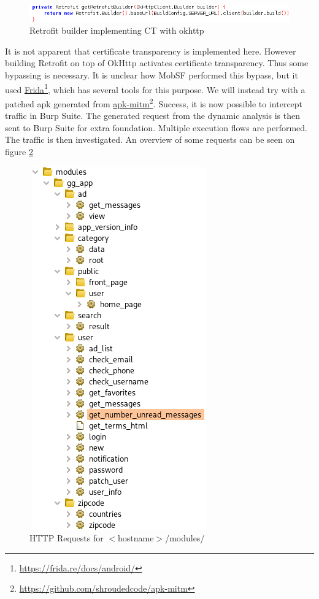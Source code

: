 \begin{figure}[htbp]
    \centering
    \includegraphics[width=1\columnwidth]{../static-analysis/pictures/retrofit-okkhtp-builder.png}
    \caption{Retrofit builder implementing CT with okhttp}
    \label{fig:retrofit-ct}
\end{figure}

It is not apparent that certificate transparency is implemented here. However building Retrofit on top of OkHttp activates certificate transparency\cite{android-certificate-transparency}. Thus some bypassing is necessary. It is unclear how MobSF performed this bypass, but it used \href{https://frida.re/docs/android/}{Frida}\footnote{\href{https://frida.re/docs/android/}{https://frida.re/docs/android/}}, which has several tools for this purpose. We will instead try with a patched apk generated from \href{https://github.com/shroudedcode/apk-mitm}{apk-mitm}\footnote{\href{https://github.com/shroudedcode/apk-mitm}{https://github.com/shroudedcode/apk-mitm}}. Success, it is now possible to intercept traffic in Burp Suite. The generated request from the dynamic analysis is then sent to Burp Suite for extra foundation. Multiple execution flows are performed. The traffic is then investigated. An overview of some requests can be seen on figure \ref{fig:http-requests-modules}    

\begin{figure}[htbp]
    \centering
    \includegraphics[width=0.5\columnwidth]{../dynamic-analysis/pictures/http-requests-modules.png}
    \caption{HTTP Requests for $<$hostname$>$/modules/}
    \label{fig:http-requests-modules}
\end{figure}

